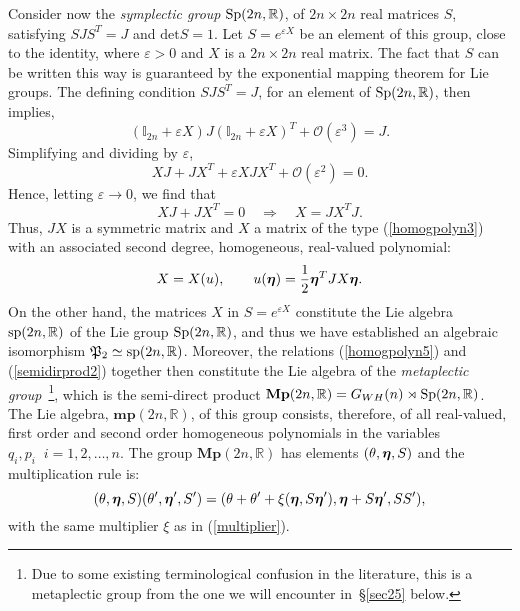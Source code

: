 \documentclass[11pt]{amsart}
\numberwithin{equation}{section}
\theoremstyle{remark}
\newcommand{\be}{\begin{equation}}
\newcommand{\en}{\end{equation}}
\newcommand{\bfeta}{\mbox{\boldmath $\eta$}}
\newcommand{\BMP}{\mathbf{Mp}}
\newcommand{\bmp}{\mathbf{mp}}
\begin{document}
Consider now the {\em symplectic group}
$\mbox{\rm Sp}(2n, \mathbb R )$, of $2n\times 2n$ real matrices $S$, satisfying
$SJS^T = J$ and $\text{det} S = 1$. Let
$S = \displaystyle{e^{\varepsilon X}}$ be an element of this group, close to
the identity, where $\varepsilon > 0$ and $X$ is a $2n\times 2n$ real matrix.
The fact that $S$ can be written this way is guaranteed by the exponential
mapping theorem for Lie groups. The defining condition $SJS^{T} = J$,
for an element of $\mbox{\rm Sp}(2n, \mathbb R )$, then implies,
 $$ ({\mathbb I}_{2n} + \varepsilon X)J({\mathbb I}_{2n} + \varepsilon X)^T
         + {\mathcal O}(\varepsilon^{3}) = J. $$
Simplifying and dividing by $\varepsilon$,
$$ XJ + JX^{T} + \varepsilon XJX^{T} + {\mathcal O}(\varepsilon^{2}) = 0.$$
Hence, letting $\varepsilon \rightarrow 0$, we find that
\be
   XJ + JX^{T} = 0 \quad \Rightarrow \quad X = JX^{T}J.
\label{symplgroup1}
\en
Thus, $JX$ is a symmetric matrix and $X$ a matrix of the type
(\ref{homogpolyn3}) with an associated second degree, homogeneous, real-valued
polynomial:
\be
   X = X(u), \qquad u(\bfeta) = \frac 12 \bfeta^{T}JX\bfeta .
\label{symplgroup2}
\en
On the other hand, the matrices $X$ in
$S = \displaystyle{e^{\varepsilon X}}$ constitute the Lie algebra
$\mbox{\rm sp}(2n, \mathbb R )$ of the Lie group
$\mbox{\rm Sp}(2n, \mathbb R )$, and thus we have established
an algebraic
isomorphism ${\mathfrak P}_{2}\simeq  \mbox{\rm sp}(2n, \mathbb R )$.
Moreover, the relations (\ref{homogpolyn5}) and (\ref{semidirprod2})
together then constitute the Lie algebra of the {\em metaplectic
group}~\footnote{Due to some existing terminological confusion in the
literature, this is a  metaplectic group from the one we
will encounter in~\S\ref{sec25} below.}, which is the semi-direct product
$\BMP(2n, \mathbb R ) =
G_{WH}(n)\rtimes\mbox{\rm Sp}(2n, \mathbb R )$. The Lie algebra,
$\bmp(2n, \mathbb R )$, of this group consists, therefore, of
all real-valued, first order and second order homogeneous polynomials
in the variables $q_i, p_{i} \;\; i=1,2, \ldots , n$. The group
$\BMP(2n, \mathbb R )$ has elements
$(\theta , \bfeta , S)$ and the multiplication rule is:
\be
(\theta , \bfeta , S)(\theta', \bfeta', S') = (\theta + \theta'
  + \xi (\bfeta , S\bfeta'), \bfeta + S\bfeta', SS'),
\label{metaplectgroup1}
\en
with the same multiplier $\xi$ as in (\ref{multiplier}).
\end{document}
